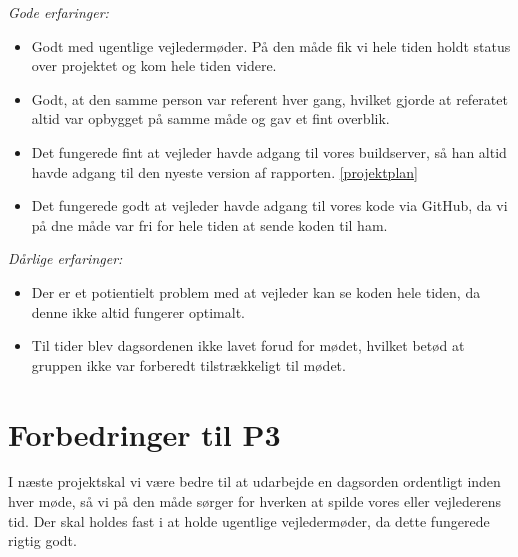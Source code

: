 \emph{Gode erfaringer:}
\begin{itemize}

\item Godt med ugentlige vejledermøder. På den måde fik vi hele tiden holdt status over projektet og kom hele tiden videre.

\item Godt, at den samme person var referent hver gang, hvilket gjorde at referatet altid var opbygget på samme måde og gav et fint overblik.

\item Det fungerede fint at vejleder havde adgang til vores buildserver, så han altid havde adgang til den nyeste version af rapporten. \ref{projektplan}

\item Det fungerede godt at vejleder havde adgang til vores kode via GitHub, da vi på dne måde var fri for hele tiden at sende koden til ham.

\end{itemize}
\emph{Dårlige erfaringer:}
\begin{itemize}

\item Der er et potientielt problem med at vejleder kan se koden hele tiden, da denne ikke altid fungerer optimalt.

\item	Til tider blev dagsordenen ikke lavet forud for mødet, hvilket betød at gruppen ikke var forberedt tilstrækkeligt til mødet.

\end{itemize}

\section{Forbedringer til P3}

I næste projektskal vi være bedre til at udarbejde en dagsorden ordentligt inden hver møde, så vi på den måde sørger for hverken at spilde vores eller vejlederens tid. Der skal holdes fast i at holde ugentlige vejledermøder, da dette fungerede rigtig godt. 
